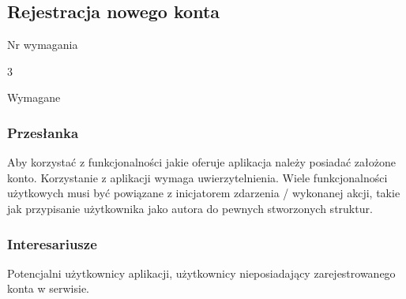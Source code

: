 \documentclass[eng,printmode]{mgr}
\begin{document}
\subsection{Rejestracja nowego konta}
\begin{labeling}{Nr wymagania}
\item [Nr wymagania:] 3
\item [Priorytet:] Wymagane
\end{labeling}

\subsubsection{Przesłanka}
Aby korzystać z funkcjonalności jakie oferuje aplikacja należy posiadać założone konto. Korzystanie z aplikacji wymaga uwierzytelnienia. Wiele funkcjonalności użytkowych musi być powiązane z inicjatorem zdarzenia / wykonanej akcji, takie jak przypisanie użytkownika jako autora do pewnych stworzonych struktur.

\subsubsection{Interesariusze}
Potencjalni użytkownicy aplikacji, użytkownicy nieposiadający zarejestrowanego konta w serwisie.
\end{document}
